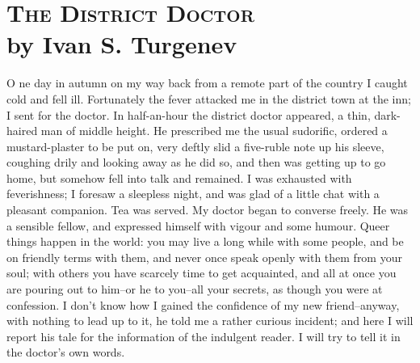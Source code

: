 \chapter{\textsc{The District Doctor}\\
\small \hspace{20pt}
by Ivan S. Turgenev}

\lettrine[lines=3,lhang=0.11,lraise=0,loversize=0.05]{O}{}%
ne day in autumn on my way back from a remote part of the country I
caught cold and fell ill. Fortunately the fever attacked me in the
district town at the inn; I sent for the doctor. In half-an-hour the
district doctor appeared, a thin, dark-haired man of middle height. He
prescribed me the usual sudorific, ordered a mustard-plaster to be put
on, very deftly slid a five-ruble note up his sleeve, coughing drily
and looking away as he did so, and then was getting up to go home, but
somehow fell into talk and remained. I was exhausted with
feverishness; I foresaw a sleepless night, and was glad of a little
chat with a pleasant companion. Tea was served. My doctor began to
converse freely. He was a sensible fellow, and expressed himself with
vigour and some humour. Queer things happen in the world: you may live
a long while with some people, and be on friendly terms with them, and
never once speak openly with them from your soul; with others you have
scarcely time to get acquainted, and all at once you are pouring out
to him--or he to you--all your secrets, as though you were at
confession. I don't know how I gained the confidence of my new
friend--anyway, with nothing to lead up to it, he told me a rather
curious incident; and here I will report his tale for the information
of the indulgent reader. I will try to tell it in the doctor's own
words.


